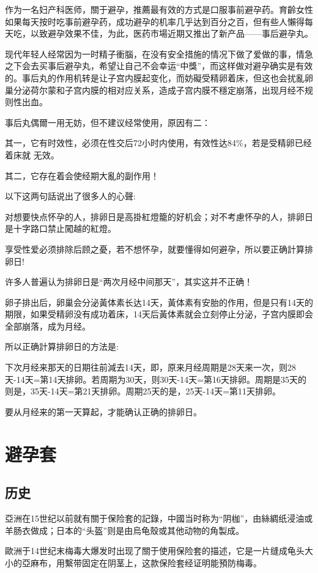 \documentclass[12pt,UTF8]{ctexbook}
\begin{document}
作为一名妇产科医师，關于避孕，推薦最有效的方式是口服事前避孕药。育齡女性如果每天按时吃事前避孕药，成功避孕的机率几乎达到百分之百，但有些人懶得每天吃，以致避孕效果不佳，为此，医药市場近期又推出了新产品——事后避孕丸。

现代年轻人经常因为一时精子衝腦，在没有安全措施的情况下做了爱做的事，情急之下会去买事后避孕丸，希望让自己不会幸运“中獎”，而这样做对避孕确实是有效的。事后丸的作用机转是让子宫内膜起变化，而妨礙受精卵着床，但这也会扰亂卵巢分泌荷尔蒙和子宫内膜的相对应关系，造成子宫内膜不穩定崩落，出现月经不规则性出血。

事后丸偶爾一用无妨，但不建议经常使用，原因有二：

其一，它有时效性，必须在性交后72小时内使用，有效性达84\%，若是受精卵已经着床就
无效。

其二，它存在着会使经期大亂的副作用！

以下这两句話说出了很多人的心聲:

对想要快点怀孕的人，排卵日是高掛紅燈籠的好机会；对不考慮怀孕的人，排卵日是十字路口禁止闖越的紅燈。

享受性爱必须排除后顾之憂，若不想怀孕，就要懂得如何避孕，所以要正确計算排卵日!

许多人普遍认为排卵日是“两次月经中间那天”，其实这并不正确！

卵子排出后，卵巢会分泌黃体素长达14天，黃体素有安胎的作用，但是只有14天的期限，如果受精卵没有成功着床，14天后黃体素就会立刻停止分泌，子宫内膜即会全部崩落，成为月经。

所以正确計算排卵日的方法是:

下次月经来那天的日期往前減去14天，即，原来月经周期是28天来一次，则28天-14天=第14天排卵。若周期为30天，则30天-14天=第16天排卵。周期是35天的则是，35天-14天=第21天排卵。周期25天的是，25天-14天=第11天排卵。

要从月经来的第一天算起，才能确认正确的排卵日。

\section{避孕套}

\subsection{历史}

亞洲在15世纪以前就有關于保险套的記錄，中國当时称为“阴枷”，由絲綢纸浸油或羊肠衣做成；日本的“头盔”则是由烏龟殼或其他动物的角製成。

歐洲于14世纪末梅毒大爆发时出现了關于使用保险套的描述，它是一片缝成龟头大小的亞麻布，用繫带固定在阴茎上，这款保险套经证明能預防梅毒。
\end{document}
